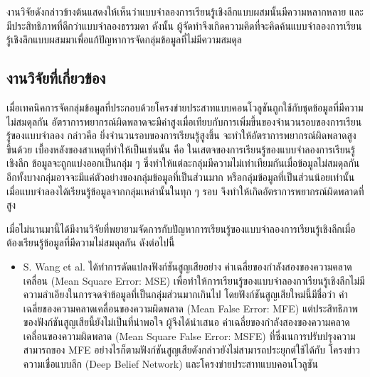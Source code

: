 งานวิจัยดังกล่าวข้างต้นแสดงให้เห็นว่าแบบจำลองการเรียนรู้เชิงลึกแบบผสมนั้นมีความหลากหลาย และมีประสิทธิภาพที่ดีกว่าแบบจำลองธรรมดา ดังนั้น ผู้จัดทำจึงเกิดความคิดที่จะคิดค้นแบบจำลองการเรียนรู้เชิงลึกแบบผสมมาเพื่อแก้ปัญหาการจัดกลุ่มข้อมูลที่ไม่มีความสมดุล

\subsection{งานวิจัยที่เกี่ยวข้อง}
เมื่อเทคนิคการจัดกลุ่มข้อมูลที่ประกอบด้วยโครงข่ายประสาทแบบคอนโวลูชันถูกใช้กับชุดข้อมูลที่มีความไม่สมดุลกัน อัตราการพยากรณ์ผิดพลาดจะมีค่าสูงเมื่อเทียบกับการเพิ่มขึ้นของจำนวนรอบของการเรียนรู้ของแบบจำลอง กล่าวคือ ยิ่งจำนวนรอบของการเรียนรู้สูงขึ้น จะทำให้อัตราการพยากรณ์ผิดพลาดสูงขึ้นด้วย \cite{Yan:2015} เบื้องหลังของสาเหตุที่ทำให้เป็นเช่นนั้น คือ ในเสตจของการเรียนรู้ของแบบจำลองการเรียนรู้เชิงลึก ข้อมูลจะถูกแบ่งออกเป็นกลุ่ม ๆ ซึ่งทำให้แต่ละกลุ่มมีความไม่เท่าเทียมกันเมื่อข้อมูลไม่สมดุลกัน อีกทั้งบางกลุ่มอาจจะมีแค่ตัวอย่างของกลุ่มข้อมูลที่เป็นส่วนมาก หรือกลุ่มข้อมูลที่เป็นส่วนน้อยเท่านั้น เมื่อแบบจำลองได้เรียนรู้ข้อมูลจากกลุ่มเหล่านั้นในทุก ๆ รอบ จึงทำให้เกิดอัตราการพยากรณ์ผิดพลาดที่สูง

เมื่อไม่นานมานี้ได้มีงานวิจัยที่พยายามจัดการกับปัญหาการเรียนรู้ของแบบจำลองการเรียนรู้เชิงลึกเมื่อต้องเรียนรู้ข้อมูลที่มีความไม่สมดุลกัน ดังต่อไปนี้

\begin{itemize}
  \item S. Wang et al. \cite{Wang:2016} ได้ทำการดัดแปลงฟังก์ชันสูญเสียอย่าง ค่าเฉลี่ยของกำลังสองของความคลาดเคลื่อน (Mean Square Error: MSE) เพื่อทำให้การเรียนรู้ของแบบจำลองกาเรียนรู้เชิงลึกไม่มีความลำเอียงในการจดจำข้อมูลที่เป็นกลุ่มส่วนมากเกินไป โดยฟังก์ชันสูญเสียใหม่นี้มีชื่อว่า ค่าเฉลี่ยของความคลาดเคลื่อนของความผิดพลาด (Mean False Error: MFE) แต่ประสิทธิภาพของฟังก์ชันสูญเสียนี้ยังไม่เป็นที่น่าพอใจ ผู้จึงได้นำเสนอ ค่าเฉลี่ยของกำลังสองของความคลาดเคลื่อนของความผิดพลาด (Mean Square False Error: MSFE) ที่ซึ่งเนการปรับปรุงความสามารถของ MFE อย่างไรก็ตามฟังก์ชันสูญเสียดังกล่าวยังไม่สามารถประยุกต์ใช้ได้กับ โครงข่าวความเชื่อแบบลึก (Deep Belief Network) และโครงข่ายประสาทแบบคอนโวลูชัน
\end{itemize}